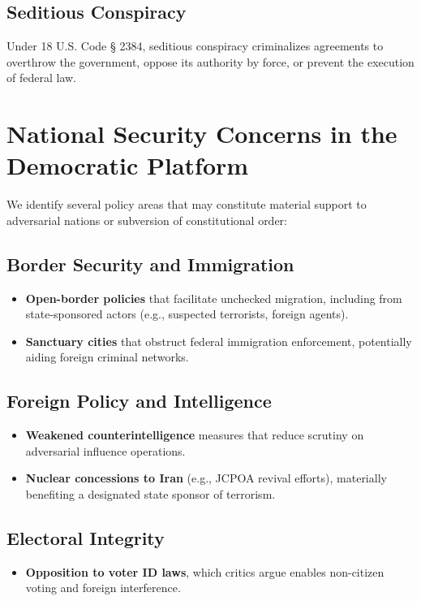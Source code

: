 \documentclass[11pt]{article}
\begin{document}
\subsection{Seditious Conspiracy}
Under 18 U.S. Code § 2384, seditious conspiracy criminalizes agreements to overthrow the government, oppose its authority by force, or prevent the execution of federal law.

\section{National Security Concerns in the Democratic Platform}
We identify several policy areas that may constitute material support to adversarial nations or subversion of constitutional order:

\subsection{Border Security and Immigration}
\begin{itemize}
    \item \textbf{Open-border policies} that facilitate unchecked migration, including from state-sponsored actors (e.g., suspected terrorists, foreign agents).
    \item \textbf{Sanctuary cities} that obstruct federal immigration enforcement, potentially aiding foreign criminal networks.
\end{itemize}

\subsection{Foreign Policy and Intelligence}
\begin{itemize}
    \item \textbf{Weakened counterintelligence} measures that reduce scrutiny on adversarial influence operations.
    \item \textbf{Nuclear concessions to Iran} (e.g., JCPOA revival efforts), materially benefiting a designated state sponsor of terrorism.
\end{itemize}

\subsection{Electoral Integrity}
\begin{itemize}
    \item \textbf{Opposition to voter ID laws}, which critics argue enables non-citizen voting and foreign interference.
\end{itemize}
\end{document}
